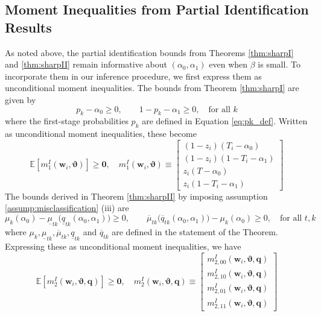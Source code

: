 \subsection{Moment Inequalities from Partial Identification Results}
\label{sec:inequalities}
As noted above, the partial identification bounds from Theorems \ref{thm:sharpI} and \ref{thm:sharpII} remain informative about $(\alpha_0, \alpha_1)$ even when $\beta$ is small.
To incorporate them in our inference procedure, we first express them as unconditional moment inequalities.
The bounds from Theorem \ref{thm:sharpI} are given by
\begin{equation*}
  p_k - \alpha_0 \geq 0, \quad \quad 1 - p_k - \alpha_1 \geq 0, \quad \mbox{for all } k 
\end{equation*}
where the first-stage probabilities $p_k$ are defined in Equation \ref{eq:pk_def}.
Written as unconditional moment inequalities, these become
\begin{equation}
  \mathbb{E}\left[ m_1^I(\mathbf{w}_i,\boldsymbol{\vartheta} ) \right] \geq \mathbf{0},  \quad
m_1^I(\mathbf{w}_i, \boldsymbol{\vartheta}) \equiv \left[
  \begin{array}{l}
    (1 - z_i)(T_i - \alpha_0) \\
    (1 - z_i)(1 - T_i - \alpha_1) \\
    z_i(T - \alpha_0) \\
    z_i (1 - T_i - \alpha_1) 
  \end{array}
\right]
\end{equation}
The bounds derived in Theorem \ref{thm:sharpII} by imposing assumption \ref{assump:misclassification} (iii) are
\begin{equation*}
  \mu_k(\alpha_0) - \underline{\mu}_{tk}\big( \underline{q}_{tk}(\alpha_0, \alpha_1) \big) \geq 0, \quad \quad
  \overline{\mu}_{tk}\big( \overline{q}_{tk}(\alpha_0, \alpha_1) \big) - \mu_k(\alpha_0) \geq 0, \quad \mbox{for all } t,k
\end{equation*}
where $\mu_k, \underline{\mu}_{tk}, \overline{\mu}_{tk}, \underline{q}_{tk}$ and $\overline{q}_{tk}$ are defined in the statement of the Theorem.
Expressing these as unconditional moment inequalities, we have
\begin{equation}
  \mathbb{E}[m_2^I(\mathbf{w}_i,\boldsymbol{\vartheta}, \mathbf{q})] \geq \mathbf{0}, \quad 
  m_2^I(\mathbf{w}_i,\boldsymbol{\vartheta}, \mathbf{q}) \equiv \left[
  \begin{array}{c}
    m_{2,00}^I(\mathbf{w}_i,\boldsymbol{\vartheta}, \mathbf{q})  \\ 
    m_{2,10}^I(\mathbf{w}_i,\boldsymbol{\vartheta}, \mathbf{q}) \\
    m_{2,01}^I(\mathbf{w}_i,\boldsymbol{\vartheta}, \mathbf{q})  \\ 
    m_{2,11}^I(\mathbf{w}_i,\boldsymbol{\vartheta}, \mathbf{q}) 
  \end{array}
\right] 
\end{equation}
